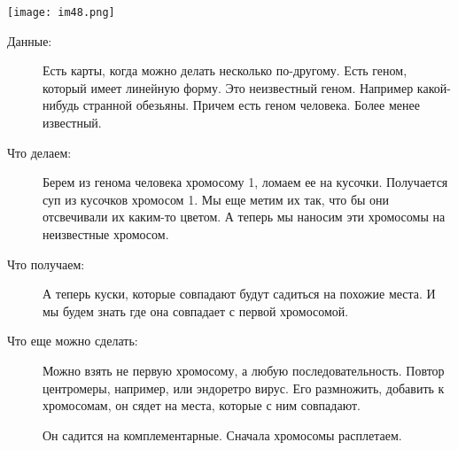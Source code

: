 \texttt{[image: im48.png]}

\begin{description}
\item[Данные:] Есть карты, когда можно делать несколько по-другому. Есть геном, 
который имеет линейную форму. Это неизвестный геном. Например 
какой-нибудь странной обезьяны. Причем есть 
геном человека. Более менее известный.

\item[Что делаем:]
Берем из генома человека хромосому 1, ломаем ее на кусочки. 
Получается суп из кусочков хромосом 1. Мы еще метим их так, 
что бы они отсвечивали их каким-то цветом. А теперь 
мы наносим эти хромосомы на неизвестные хромосом. 

\item[Что получаем:]
А теперь куски, которые совпадают будут садиться на 
похожие места. И мы будем знать где она совпадает 
с первой хромосомой. 

\item[Что еще можно сделать:]
Можно взять не первую хромосому, а любую последовательность. 
Повтор центромеры, например, или эндоретро вирус. Его размножить, 
добавить к хромосомам, он сядет на места, которые с ним совпадают. 

Он садится на комплементарные. Сначала хромосомы расплетаем. 
\end{description}

